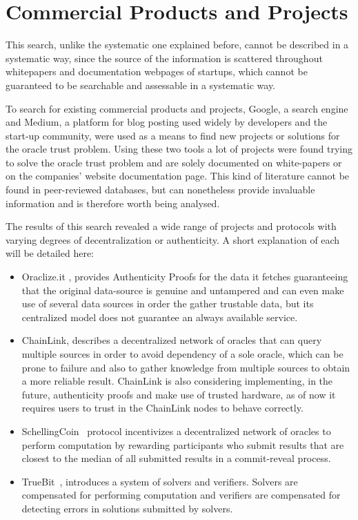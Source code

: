 \section{Commercial Products and Projects}

This search, unlike the systematic one explained before, cannot be described in a systematic way, since the source of the information is scattered throughout whitepapers and documentation webpages of startups, which cannot be guaranteed to be searchable and assessable in a systematic way.

To search for existing commercial products and projects, Google, a search engine and Medium, a platform for blog posting used widely by developers and the start-up community, were used as a means to find new projects or solutions for the oracle trust problem. Using these two tools a lot of projects were found trying to solve the oracle trust problem and are solely documented on white-papers or on the companies' website documentation page. This kind of literature cannot be found in peer-reviewed databases, but can nonetheless provide invaluable information and is therefore worth being analysed.

The results of this search revealed a wide range of projects and protocols with varying degrees of decentralization or authenticity. A short explanation of each will be detailed here:

\begin{itemize}
  \item Oraclize.it \cite{Oraclize.it2018}, provides Authenticity Proofs for the data it fetches guaranteeing that the original data-source is genuine and untampered and can even make use of several data sources in order the gather trustable data, but its centralized model does not guarantee an always available service.
  \item ChainLink\cite{Ellis2017}, describes a decentralized network of oracles that can query multiple sources in order to avoid dependency of a sole oracle, which can be prone to failure and also to gather knowledge from multiple sources to obtain a more reliable result. ChainLink is also considering implementing, in the future, authenticity proofs and make use of trusted hardware, as of now it requires users to trust in the ChainLink nodes to behave correctly.
  \item SchellingCoin~\cite{VitalikButerin2014} protocol incentivizes a decentralized network of oracles to perform computation by rewarding participants who submit results that are closest to the median of all submitted results in a commit-reveal process.
  \item TrueBit~\cite{Teutsch2017}, introduces a system of solvers and verifiers. Solvers are compensated for performing computation and verifiers are compensated for detecting errors in solutions submitted by solvers.
\end{itemize}


